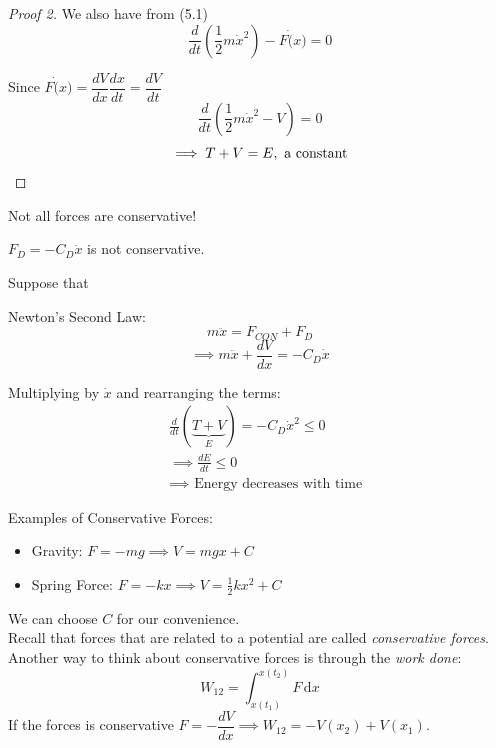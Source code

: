 \documentclass[10pt]{scrartcl}
\begin{document}
\begin{proof}[Proof 2] We also have from (5.1)
\[\frac{d}{dt}\left(\frac{1}{2}m\dot{x}^2\right) - F\dot(x) = 0\]

Since $F\dot(x) = \dfrac{dV}{dx}\dfrac{dx}{dt} = \dfrac{dV}{dt}$
\[\frac{d}{dt}\left(\frac{1}{2}m\dot{x}^2 - V\right) = 0
\]
\[\implies T + V = E, \text{ a constant}\qedhere\]
\end{proof}



Not all forces are conservative!\\

\begin{example}
$F_D = -C_D\dot{x}$	is not conservative. 

Suppose that 
\begin{center}
	
\end{center}

Newton's Second Law:
\[m\ddot{x} = F_{CON} + F_D\]
\[\implies m\ddot{x} + \frac{dV}{dx} = -C_D\dot{x}\]

Multiplying by $\dot{x}$ and rearranging the terms:
\[\begin{aligned}&\frac{d}{dt}(\underbrace{T + V}_{E}) = -C_D\dot{x}^2 \leq 0\\
&\implies \frac{dE}{dt} \leq 0 \\
&\implies \text{ Energy decreases with time}
\end{aligned}\]
\end{example}

Examples of Conservative Forces:
\begin{itemize}
\item Gravity: $F = -mg \implies V = mgx + C$	
\item Spring Force: $F = -kx \implies V = \frac{1}{2}kx^2 + C$
\end{itemize}
We can choose $C$ for our convenience.\\


Recall that forces that are related to a potential are called \emph{conservative forces}. Another way to think about conservative forces is through the \emph{work done}:
\[W_{12} = \int_{x(t_1)}^{x(t_2)}F\,\mathrm{d}x	\]
If the forces is conservative $F = -\dfrac{dV}{dx} \implies W_{12} = -V(x_2) + V(x_1)$. 
\end{document}
